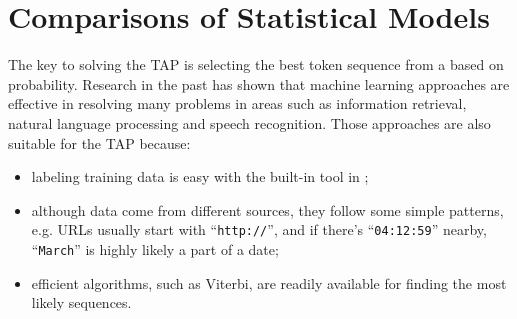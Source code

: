 

\section{Comparisons of Statistical Models}\label{sec:stats}

The key to solving the TAP is selecting the best token sequence 
from a \seqset{} based on probability.
Research in the past 
\cite{Seymore99learninghidden,Pinto+:texttables,borkar+:text-segmentation,rabiner89:hmm}  
has shown that machine learning approaches
are effective in resolving many problems in areas such as
information retrieval, natural language processing and 
speech recognition. Those approaches are also
suitable for the TAP because:
\begin{itemize}
\item labeling training data is easy with the built-in tool in \pads{};
\item although data come from different sources, they follow some
simple patterns, e.g. URLs usually start with ``{\tt http://}'', 
and if there's ``{\tt 04:12:59}'' nearby, ``{\tt March}'' is highly likely 
a part of a date;
\item efficient algorithms, such as Viterbi, are readily available for finding
the most likely sequences.
\end{itemize}


